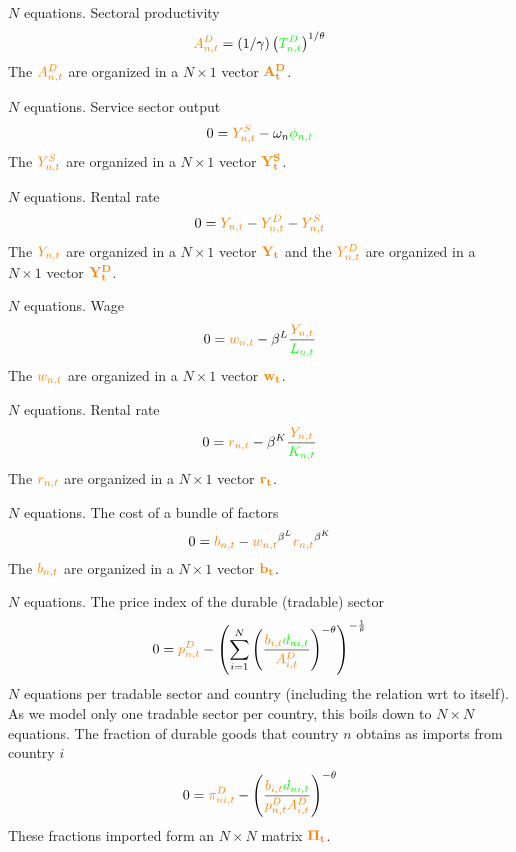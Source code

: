 \documentclass[11pt]{article}
\newcommand{\cl}[1]{{\color{orange}{#1}}}
\newcommand{\st}[1]{{\color{green}{#1}}}
\begin{document}
\noindent $N$ equations. Sectoral productivity
\begin{equation}
\cl{A_{n, t}^{D}}=(1 / \gamma)\left(\st{T_{n, t}^{D}}\right)^{1 / \theta}
\end{equation}
The $\cl{A^D_{n,t}}$ are organized in a $ N \times 1$ vector $\mathbf{\cl{A^D_t}}$.

\noindent $N$ equations. Service sector output
\begin{equation}
0 =\cl{Y^S_{n,t}} - \omega_n \st{\phi_{n,t}}
\end{equation}
The $\cl{Y^S_{n,t}}$ are organized in a $ N \times 1$ vector $\mathbf{\cl{Y^S_t}}$.

\noindent $N$ equations. Rental rate
\begin{equation}
0 =\cl{Y_{n,t}} - \cl{Y^D_{n,t}} - \cl{Y^S_{n,t}}
\end{equation}
The $\cl{Y_{n,t}}$ are organized in a $ N \times 1$ vector $\mathbf{\cl{Y_t}}$ and the $\cl{Y^D_{n,t}}$ are organized in a $ N \times 1$ vector $\mathbf{\cl{Y^D_t}}$.

\noindent $N$ equations. Wage
\begin{equation}
0 =\cl{w_{n,t}} - \beta^L \frac{\cl{Y_{n,t}}}{\st{L_{n,t}}}
\end{equation}
The $\cl{w_{n,t}}$ are organized in a $ N \times 1$ vector $\mathbf{\cl{w_t}}$.


\noindent $N$ equations. Rental rate
\begin{equation}
  0 = \cl{r_{n,t}} - \beta^K \frac{\cl{Y_{n,t}}}{\st{K_{n,t}}}
\end{equation}
The $\cl{r_{n,t}}$ are organized in a $ N \times 1$ vector $\mathbf{\cl{r_t}}$.

\noindent $N$ equations. The cost of a bundle of factors
\begin{equation}
0 = \cl{b_{n,t}} - \cl{w_{n,t}}^{\beta^L}\cl{r_{n,t}}^{\beta^K}
\end{equation}
The $\cl{b_{n,t}}$ are organized in a $ N \times 1$ vector $\mathbf{\cl{b_t}}$.


\noindent $N$ equations. The price index of the durable (tradable) sector
\begin{equation}
0 = \cl{p^D_{n,t}} - \left(\sum^{N}_{i=1} \left( \frac{\cl{b_{i,t}} \st{d_{ni,t}}}{\cl{A_{i,t}^D}} \right)^{-\theta} \right)^{-\frac{1}{\theta}}
\end{equation}
$N$ equations per tradable sector and country (including the relation wrt to itself). As we model only one tradable sector per country, this boils down to $N \times N$ equations. The fraction of durable goods that country $n$ obtains as imports from country $i$
\begin{equation}
0 = \cl{\pi^D_{ni,t}} - \left( \frac{\cl{b_{i,t}} \st{d_{ni,t}}}{\cl{p_{n,t}^D} \cl{A_{i,t}^D}} \right)^{-\theta}
\end{equation}
These fractions imported form an $N \times N$ matrix $\mathbf{\cl{\Pi_t}}$.
\end{document}
